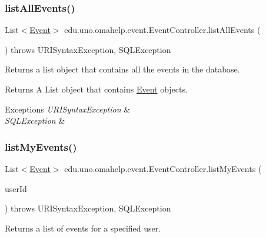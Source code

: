 \subsubsection{\texorpdfstring{list\+All\+Events()}{listAllEvents()}}
{\footnotesize\ttfamily List$<$\mbox{\hyperlink{classedu_1_1uno_1_1omahelp_1_1event_1_1_event}{Event}}$>$ edu.\+uno.\+omahelp.\+event.\+Event\+Controller.\+list\+All\+Events (\begin{DoxyParamCaption}{ }\end{DoxyParamCaption}) throws U\+R\+I\+Syntax\+Exception, S\+Q\+L\+Exception}

Returns a list object that contains all the events in the database.

\begin{DoxyReturn}{Returns}
A List object that contains \mbox{\hyperlink{classedu_1_1uno_1_1omahelp_1_1event_1_1_event}{Event}} objects. 
\end{DoxyReturn}

\begin{DoxyExceptions}{Exceptions}
{\em U\+R\+I\+Syntax\+Exception} & \\
\hline
{\em S\+Q\+L\+Exception} & \\
\hline
\end{DoxyExceptions}
\mbox{\label{classedu_1_1uno_1_1omahelp_1_1event_1_1_event_controller_a829db25a4758bcb33dbc7735aad24ae4}} 
\subsubsection{\texorpdfstring{list\+My\+Events()}{listMyEvents()}}
{\footnotesize\ttfamily List$<$\mbox{\hyperlink{classedu_1_1uno_1_1omahelp_1_1event_1_1_event}{Event}}$>$ edu.\+uno.\+omahelp.\+event.\+Event\+Controller.\+list\+My\+Events (\begin{DoxyParamCaption}\item[{@Path\+Variable int}]{user\+Id }\end{DoxyParamCaption}) throws U\+R\+I\+Syntax\+Exception, S\+Q\+L\+Exception}

Returns a list of events for a specified user.


